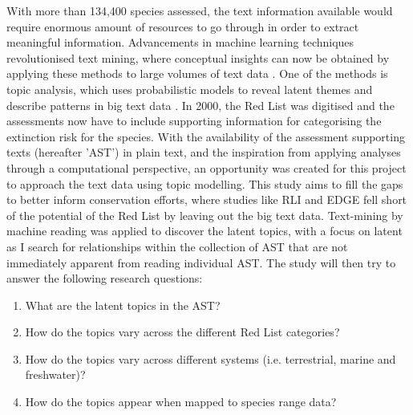 With more than 134,400 species assessed, the text information available would require enormous amount of resources to go through in order to extract meaningful information. Advancements in machine learning techniques revolutionised text mining, where conceptual insights can now be obtained by applying these methods to large volumes of text data \parencite{grimmer2013text}. One of the methods is topic analysis, which uses probabilistic models to reveal latent themes and describe patterns in big text data \parencite{blei2012probabilistic}. In 2000, the Red List was digitised \parencite{iucn2021} and the assessments now have to include supporting information for categorising the extinction risk for the species. With the availability of the assessment supporting texts (hereafter 'AST') in plain text, and the inspiration from applying analyses through a computational perspective, an opportunity was created for this project to approach the text data using topic modelling. This study aims to fill the gaps to better inform conservation efforts, where studies like RLI and EDGE fell short of the potential of the Red List by leaving out the big text data. Text-mining by machine reading was applied to discover the latent topics, with a focus on latent as I search for relationships within the collection of AST that are not immediately apparent from reading individual AST. The study will then try to answer the following research questions:
\begin{enumerate}
    \item What are the latent topics in the AST?
    \item How do the topics vary across the different Red List categories?
    \item How do the topics vary across different systems (i.e. terrestrial, marine and freshwater)?
    \item How do the topics appear when mapped to species range data?
\end{enumerate}
